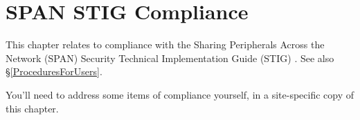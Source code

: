 \chapter{SPAN STIG Compliance}
\label{SPANSTIGCompliance}

This chapter relates to compliance with the Sharing Peripherals Across
the Network (SPAN) Security Technical Implementation Guide (STIG)
\cite{span-stig}. See also \S\ref{ProceduresForUsers}.

You'll need to address some items of compliance yourself, in a
site-specific copy of this chapter.
